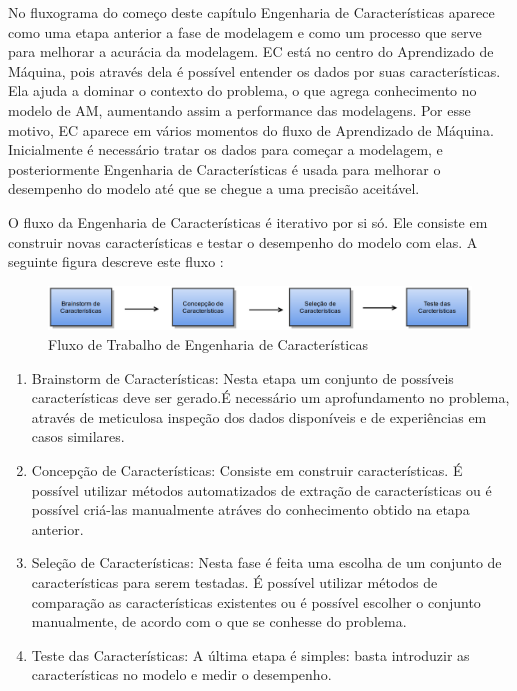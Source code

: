 No fluxograma do começo deste capítulo Engenharia de Características aparece como uma etapa anterior a fase de modelagem e como um processo que serve para melhorar a acurácia da modelagem. EC está no centro do Aprendizado de Máquina, pois através dela é possível entender os dados por suas características. Ela ajuda a dominar o contexto do problema, o que agrega conhecimento no modelo de AM, aumentando assim a performance das modelagens. Por esse motivo, EC aparece em vários momentos do fluxo de Aprendizado de Máquina. Inicialmente é necessário tratar os dados para começar a modelagem, e posteriormente Engenharia de Características é usada para melhorar o desempenho do modelo até que se chegue a uma precisão aceitável. 

O fluxo da Engenharia de Características é iterativo por si só. Ele consiste em construir novas características e testar o desempenho do modelo com elas. A seguinte figura descreve este fluxo \cite{fe2014}:


\begin{figure}[!h]
\centering
\includegraphics[keepaspectratio=true,scale=0.32]
{figuras/ecworflow.eps}
\caption{Fluxo de Trabalho de Engenharia de Características}
\label{workflow_ec}
\end{figure}

\begin{enumerate}
\item Brainstorm de Características: Nesta etapa um conjunto de possíveis características deve ser gerado.É necessário um aprofundamento no problema, através de meticulosa inspeção dos dados disponíveis e de experiências em casos similares. 
\item Concepção de Características: Consiste em construir características. É possível utilizar métodos automatizados de extração de características ou é possível criá-las manualmente atráves do conhecimento obtido na etapa anterior.
\item Seleção de Características: Nesta fase é feita uma escolha de um conjunto de características para serem testadas. É possível utilizar métodos de comparação as características existentes ou é possível escolher o conjunto  manualmente, de acordo com o que se conhesse do problema.
\item Teste das Características: A última etapa é simples: basta introduzir as características no modelo e medir o desempenho.
\end{enumerate}

